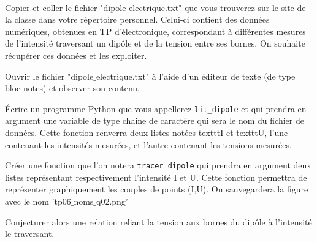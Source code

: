 \exer{[FIC-009]}
\setcounter{numques}{0}~\\


Copier et coller le fichier "dipole$\_$electrique.txt" que vous trouverez sur le site de la classe dans votre répertoire personnel. Celui-ci contient des données numériques, obtenues en TP d’électronique, correspondant à différentes mesures de l'intensité traversant un dipôle et de la tension entre ses bornes. On souhaite récupérer ces données et les exploiter.

Ouvrir le fichier "dipole$\_$electrique.txt" à l'aide d'un éditeur de texte (de type bloc-notes) et observer son contenu.

\question{}Écrire un programme Python que vous appellerez \texttt{lit\_dipole} et qui prendra en argument une variable de type chaine de caractère qui sera le nom du fichier de données. Cette fonction renverra deux listes notées texttt{I} et texttt{U},  l'une contenant les intensités mesurées, et l'autre contenant les
tensions mesurées.

\question{}Créer une fonction que l'on notera \texttt{tracer\_dipole}  qui prendra en argument deux listes représentant respectivement l'intensité I et U. Cette fonction permettra de représenter graphiquement les couples de points (I,U). On sauvegardera la figure avec le nom 'tp06$\_$noms$\_$q02.png'



\question{}Conjecturer alors une relation reliant la tension aux bornes du dipôle à l'intensité le traversant.